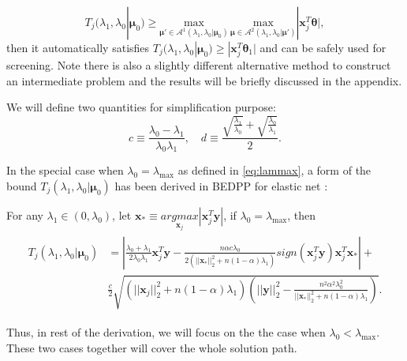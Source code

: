 \begin{equation}
    \label{eq:boundbound}
    T_j(\lambda_{1},\lambda_{0}|\boldsymbol\mu_0)\geq \underset{\boldsymbol\mu'\in\mathcal{A}^1(\lambda_1,\lambda_0|\boldsymbol\mu_0)}{\mathrm{max}}\,\underset{\boldsymbol\mu\in\mathcal{A}^2(\lambda_1,\lambda_0|\boldsymbol\mu')}{\mathrm{max}}|\boldsymbol x_j^T\boldsymbol\theta|,
\end{equation}
then it automatically satisfies $T_j(\lambda_{1},\lambda_{0}|\boldsymbol\mu_0)\geq |\boldsymbol x_j^T\boldsymbol\theta_1|$ and can be safely used for screening. Note there is also a slightly different alternative method to construct an intermediate problem and the results will be briefly discussed in the appendix.

We will define two quantities for simplification purpose: 
\begin{equation}
    c\equiv\frac{\lambda_0-\lambda_1}{\lambda_0\lambda_1},\quad d\equiv \frac{\sqrt{\frac{\lambda_1}{\lambda_0}}+\sqrt{\frac{\lambda_0}{\lambda_1}}}{2}.
\end{equation}

In the special case when $\lambda_0=\lambda_{\max}$ as defined in \eqref{eq:lammax}, a form of the bound $T_j(\lambda_{1},\lambda_{0}|\boldsymbol\mu_0)$ has been derived in BEDPP for elastic net \citep{Zeng2021}:

\begin{theorem}
    \label{thm:0.1}
    For any $\lambda_1\in(0,\lambda_{0})$, let $\boldsymbol x_*\equiv\underset{\boldsymbol x_j}{argmax}|\boldsymbol x_j^T\boldsymbol y|$, if $\lambda_0=\lambda_{\max}$, then
    \begin{gather}
        \begin{aligned}
            T_j(\lambda_{1},\lambda_{0}|\boldsymbol\mu_0)&=\left|\frac{\lambda_{0}+\lambda_1}{2\lambda_{0}\lambda_1}\boldsymbol x_j^T\boldsymbol y-\frac{n\alpha c\lambda_{0}}{2(||\boldsymbol x_*||_2^2+n(1-\alpha)\lambda_1)}\textit{sign}(\boldsymbol x_j^T\boldsymbol y) \boldsymbol x_j^T\boldsymbol x_*\right|+\\
            &\frac{c}{2}\sqrt{\left(||\boldsymbol x_j||_2^2+n(1-\alpha)\lambda_1\right)\left(||\boldsymbol y||_2^2-\frac{n^2\alpha^2\lambda_{0}^2}{||\boldsymbol x_*||_2^2+n(1-\alpha)\lambda_1}\right)}.
        \end{aligned}
    \end{gather}
\end{theorem}
Thus, in rest of the derivation, we will focus on the the case when $\lambda_0<\lambda_{\max}$. These two cases together will cover the whole solution path.

